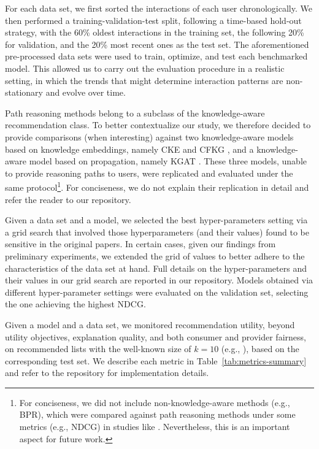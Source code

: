 \documentclass[runningheads]{llncs}
\begin{document}
For each data set, we first sorted the interactions of each user chronologically. 
{\color{black}We then performed a training-validation-test split, following a time-based hold-out strategy, with the 60\% oldest interactions in the training set, the following 20\% for validation, and the 20\% most recent ones as the test set.
The aforementioned pre-processed data sets were used to train, optimize, and test each benchmarked model.
This allowed us to carry out the evaluation procedure in a realistic setting, in which the trends that might determine interaction patterns are non-stationary and evolve over time}.


Path reasoning methods belong to a subclass of the knowledge-aware recommendation class.
To better contextualize our study, we therefore decided to provide comparisons (when interesting) against two knowledge-aware models based on knowledge embeddings, 
namely CKE \cite{cke} and CFKG \cite{cfkg}, and a knowledge-aware model based on propagation, namely KGAT \cite{kgat}.
These three models, unable to provide reasoning paths to users, were replicated and evaluated under the same protocol\footnote{
For conciseness, we did not include non-knowledge-aware methods (e.g., BPR), which were compared against path reasoning methods under some metrics (e.g., NDCG) in studies like \cite{Balloccu2022ReinforcementRR}. Nevertheless, this is an important aspect for future work.}.
For conciseness, we do not explain their replication in detail and refer the reader to our repository. 
 
Given a data set and a model, we selected the best hyper-parameters setting via a grid search that involved those hyperparameters (and their values) found to be sensitive in the original papers.
In certain cases, given our findings from preliminary experiments, we extended the grid of values to better adhere to the characteristics of the data set at hand. 
Full details on the hyper-parameters and their values in our grid search are reported in our repository. 
Models obtained via different hyper-parameter settings were evaluated on the validation set, selecting the one achieving the highest NDCG.  

Given a model and a data set, we monitored recommendation utility, beyond utility objectives, explanation quality, and both consumer and provider fairness, on recommended lists with the well-known size of $k=10$ (e.g., \cite{10.1007/978-3-030-99736-6_37}), based on the corresponding test set. 
We describe each metric in Table~\ref{tab:metrics-summary} and refer to the repository for implementation details.
\end{document}
